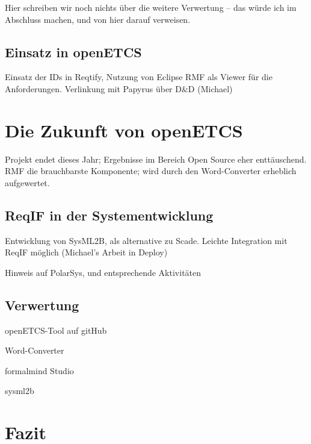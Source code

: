 \documentclass[twoside]{article}
\begin{document}
\begin{multicols}{2}
Hier schreiben wir noch nichts über die weitere Verwertung – das würde ich im Abschluss machen, und von hier darauf verweisen.

\subsection{Einsatz in openETCS}

Einsatz der IDs in Reqtify, Nutzung von Eclipse RMF als Viewer für die Anforderungen. Verlinkung mit Papyrus über D\&D (Michael)

\section{Die Zukunft von openETCS}

Projekt endet dieses Jahr; Ergebnisse im Bereich Open Source eher enttäuschend. RMF die brauchbarste Komponente; wird durch den Word-Converter erheblich aufgewertet.

\subsection{ReqIF in der Systementwicklung}

Entwicklung von SysML2B, als alternative zu Scade.  Leichte Integration mit ReqIF möglich (Michael's Arbeit in Deploy)

Hinweis auf PolarSys, und entsprechende Aktivitäten

\subsection{Verwertung}

openETCS-Tool auf gitHub

Word-Converter

formalmind Studio

sysml2b

\section{Fazit}


\end{multicols}

\titleformat{\section}[block]{\large\scshape\centering{}}{}{1em}{}



\end{document}
